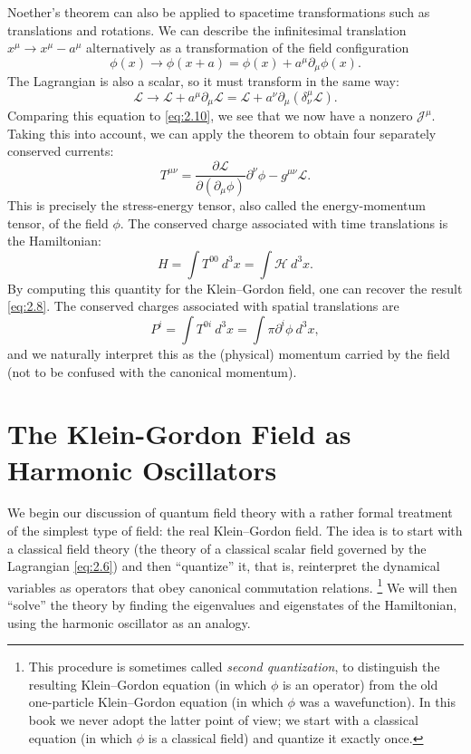 Noether's theorem can also be applied to spacetime transformations such as
translations and rotations.  We can describe the infinitesimal translation
$x^\mu \to x^\mu - a^\mu$ alternatively as a transformation of the field
configuration
\begin{equation}
  \phi(x) \to \phi(x+a) = \phi(x) + a^\mu\partial_\mu\phi(x).
\end{equation}
The Lagrangian is also a scalar, so it must transform in the same way:
\begin{equation}
  \mathcal{L} \to \mathcal{L} + a^\mu\partial_\mu\mathcal{L}
    = \mathcal{L} + a^\nu\partial_\mu(\delta^\mu_\nu\mathcal{L}).
\end{equation}
Comparing this equation to \eqref{eq:2.10}, we see that we now have a
nonzero $\mathcal{J}^\mu$.  Taking this into account, we can apply the
theorem to obtain four separately conserved currents:
\begin{equation}
  T^{\mu\nu} = \frac{\partial\mathcal{L}}{\partial(\partial_\mu\phi)}
    \partial^\nu\phi - g^{\mu\nu}\mathcal{L} .
  \label{eq:2.17}
\end{equation}
This is precisely the stress-energy tensor, also called the
energy-momentum tensor, of the field $\phi$.  The conserved charge
associated with time translations is the Hamiltonian:
\begin{equation}
  H = \int T^{00}\ d^3x = \int \mathcal{H}\ d^3x.
  \label{eq:2.18}
\end{equation}
By computing this quantity for the Klein--Gordon field, one can recover
the result \eqref{eq:2.8}.  The conserved charges associated with spatial
translations are
\begin{equation}
  P^i = \int T^{0i}\ d^3x = \int \pi\partial^i\phi\ d^3x ,
  \label{eq:2.19}
\end{equation}
and we naturally interpret this as the (physical) momentum carried by the
field (not to be confused with the canonical momentum).

\section{The Klein-Gordon Field as Harmonic Oscillators}

We begin our discussion of quantum field theory with a rather formal
treatment of the simplest type of field: the real Klein--Gordon field.
The idea is to start with a classical field theory (the theory of a
classical scalar field governed by the Lagrangian \eqref{eq:2.6}) and then
``quantize'' it, that is, reinterpret the dynamical variables as operators
that obey canonical commutation relations.%
\footnote{This procedure is sometimes called \emph{second quantization}, to
distinguish the resulting Klein--Gordon equation (in which $\phi$ is an
operator) from the old one-particle Klein--Gordon equation (in which
$\phi$ was a wavefunction).  In this book we never adopt the latter point
of view; we start with a classical equation (in which $\phi$ is a
classical field) and quantize it exactly once.}  We will then ``solve''
the theory by finding the eigenvalues and eigenstates of the Hamiltonian,
using the harmonic oscillator as an analogy.

